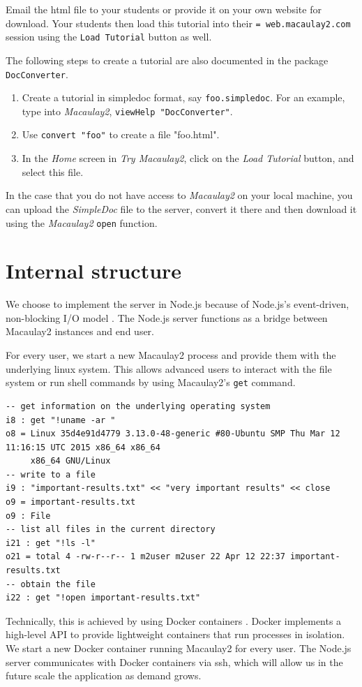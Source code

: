 \documentclass[twocolumn]{article}
\def\tryM2{{\it Try Macaulay2}}
\def\M2{{\it Macaulay2}}
\begin{document}
Email the html file to your students or provide it on your own website for download. Your students then load this tutorial into their {\tt= web.macaulay2.com} session using the {\tt Load Tutorial} button as well.

The following steps to create a tutorial are also documented in the package {\tt DocConverter}.
\begin{enumerate}
\item Create a tutorial in simpledoc format, say {\tt foo.simpledoc}.  For an example, type into \M2, {\tt viewHelp "DocConverter"}.
\item Use {\tt convert "foo"} to create a file "foo.html".
\item In the {\it Home} screen in \tryM2, click on the {\it Load Tutorial} button, and select this file.
\end{enumerate}

In the case that you do not have access to \M2 on your local machine, you can upload the {\it SimpleDoc} file to the server, convert it there and then download it using the \M2 {\tt open} function.


\section{Internal structure}

We choose to implement the server in Node.js
because of Node.js's event-driven, non-blocking I/O model \cite{nodejs}.
The Node.js server functions as a bridge between Macaulay2 instances and end user.

For every user, we start a new Macaulay2 process and
provide them with the underlying linux system. This allows advanced users to
interact with the file system or run shell commands by using Macaulay2's {\tt get} command.

\begin{lstlisting}[breaklines]
-- get information on the underlying operating system
i8 : get "!uname -ar "
o8 = Linux 35d4e91d4779 3.13.0-48-generic #80-Ubuntu SMP Thu Mar 12 11:16:15 UTC 2015 x86_64 x86_64
     x86_64 GNU/Linux
-- write to a file     
i9 : "important-results.txt" << "very important results" << close
o9 = important-results.txt
o9 : File
-- list all files in the current directory
i21 : get "!ls -l"
o21 = total 4 -rw-r--r-- 1 m2user m2user 22 Apr 12 22:37 important-results.txt
-- obtain the file
i22 : get "!open important-results.txt"
\end{lstlisting}

Technically, this is achieved by using Docker containers \cite{docker}. Docker implements
a high-level  API to provide lightweight containers that run processes in isolation.
We start a new Docker container running Macaulay2 for every user. The Node.js
server communicates with Docker containers via ssh, which will allow us in the future
scale the application as demand grows.
\end{document}
